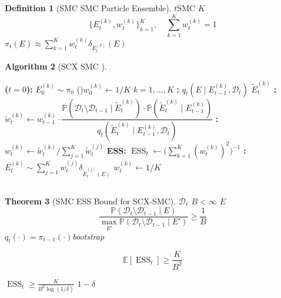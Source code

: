 \documentclass[12pt,a4paper]{article}
\theoremstyle{plain}
\newtheorem{theorem}{ Theorem}[section]
\theoremstyle{definition}
\newtheorem{definition}[theorem]{ Definition}
\newtheorem{algorithm-env}[theorem]{ Algorithm}
\newcommand{\E}{\mathbb{E}}
\newcommand{\Pbb}{\mathbb{P}}
\newcommand{\D}{\mathcal{D}}
\DeclareMathOperator{\ESS}{ESS}
\begin{document}
\begin{definition}[SMC  SMC Particle Ensemble]
 $t$SMC  $K$ 
\begin{equation}
    \{E_t^{(k)}, w_t^{(k)}\}_{k=1}^K,\quad \sum_{k=1}^K w_t^{(k)} = 1
\end{equation}
 $\pi_t(E) \approx \sum_{k=1}^K w_t^{(k)} \delta_{E_t^{(k)}}(E)$
\end{definition}

\begin{algorithm-env}[SCX  SMC ]
\begin{algorithmic}[1]
\State \textbf{ ($t=0$):}
    $E_0^{(k)} \sim \pi_0$ ()$w_0^{(k)} \leftarrow 1/K$ $k=1,\ldots,K$
    \State \textbf{:}
         $q_t(E \mid E_{t-1}^{(k)}, \D_t)$ 
        $\tilde{E}_t^{(k)}$
    \State \textbf{:}
        $\tilde{w}_t^{(k)} \leftarrow w_{t-1}^{(k)} \cdot
        \dfrac{\Pbb(\D_t \setminus \D_{t-1} \mid \tilde{E}_t^{(k)})
              \cdot \Pbb(\tilde{E}_t^{(k)} \mid E_{t-1}^{(k)})}
             {q_t(\tilde{E}_t^{(k)} \mid E_{t-1}^{(k)}, \D_t)}$
    \State \textbf{:}
        $w_t^{(k)} \leftarrow \tilde{w}_t^{(k)} / \sum_{j=1}^K \tilde{w}_t^{(j)}$
    \State \textbf{ ESS:}
        $\ESS_t \leftarrow \big(\sum_{k=1}^K (w_t^{(k)})^2\big)^{-1}$
    \If{$\ESS_t < \alpha K$ $\alpha = 0.5$}
        \State \textbf{:}
            $E_t^{(k)} \sim \sum_{j=1}^K w_t^{(j)} \delta_{\tilde{E}_t^{(j)}(E)}$
            $w_t^{(k)} \leftarrow 1/K$
    \EndIf
\EndFor
\end{algorithmic}
\end{algorithm-env}

\subsection{}

\begin{theorem}[SMC  ESS Bound for SCX-SMC]
\label{thm:ess_bound}
 $\D_t$  $B < \infty$  $E$
\begin{equation}
    \frac{\Pbb(\D_t \setminus \D_{t-1} \mid E)}{\max_{E'} \Pbb(\D_t \setminus \D_{t-1} \mid E')} \geq \frac{1}{B}
\end{equation}
 $q_t(\cdot) = \pi_{t-1}(\cdot)$bootstrap 


\begin{equation}\label{eq:ess_bound}
    \E[\ESS_t] \geq \frac{K}{B^2}
\end{equation}

$\ESS_t \geq \frac{K}{B^2 \log(1/\delta)}$  $1-\delta$ 
\end{theorem}
\end{document}
